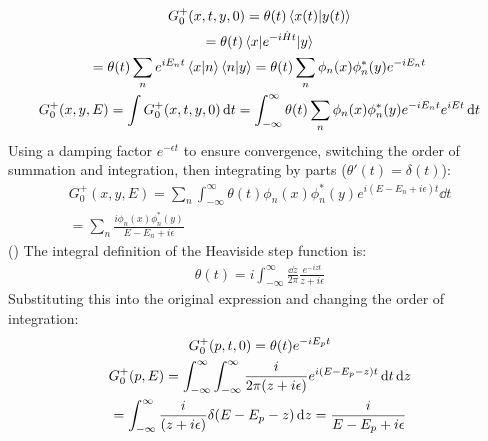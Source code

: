 \documentclass{report}
\theoremstyle{definition}
\begin{document}
\begin{chapter16}\label{prob:2}
	\begin{gather*}
		G^+_0(x,t,y,0) = \theta(t)\ip{x(t)}{y(t)} \\
		= \theta(t)\mel{x}{e^{-i\hat Ht}}{y} \\
		= \theta(t)\sum_n e^{iE_n t}\ip{x}{n}\ip{n}{y} = \theta(t)\sum_n\phi_{n}(x)\phi_n^*(y)e^{-iE_n t} \\
		G^+_0(x,y,E) = \int G^+_0(x,t,y,0) \dd{t} = \int_{-\infty}^{\infty} \theta(t)\sum_n\phi_{n}(x)\phi_n^*(y)e^{-iE_n t}e^{iEt} \dd{t}
	\end{gather*}
	Using a damping factor $e^{-\epsilon t}$ to ensure convergence, switching the order of summation and integration, then integrating by parts ($\theta'(t) = \delta(t)$):
	\begin{gather*}
		G^+_0(x,y,E) = \sum_n\int_{-\infty}^{\infty} \theta(t)\phi_{n}(x)\phi_n^*(y)e^{i(E - E_n + i\epsilon)t} \dd{t}\\
		= \sum_n \frac{i\phi_{n}(x)\phi_n^*(y)}{E - E_n + i\epsilon}
	\end{gather*}
	() The integral definition of the Heaviside step function is:
	\begin{gather*}
		\theta(t) = i\int_{-\infty}^{\infty}\frac{\dd z}{2\pi}\frac{e^{-izt}}{z+i\epsilon}
	\end{gather*}
	Substituting this into the original expression and changing the order of integration:
	\begin{gather*}
		G^+_0(p,t,0) = \theta(t)e^{-iE_p t} \\
		G^+_0(p,E) = \int_{-\infty}^{\infty}\int_{-\infty}^{\infty}\frac{i}{2\pi\pqty{z+i\epsilon}}e^{i\pqty{E - E_p - z}t} \dd{t}\dd{z} \\
		= \int_{-\infty}^{\infty}\frac{i}{\pqty{z+i\epsilon}}\delta{\pqty{E - E_p - z}} \dd{z} = \frac{i}{E - E_p + i\epsilon}
	\end{gather*}
\end{chapter16}
\end{document}
